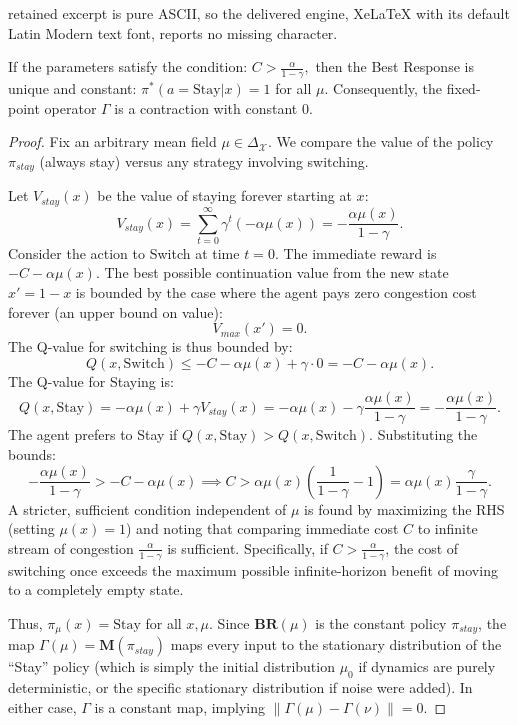 \documentclass[10pt,a4paper]{amsart}
\newcommand{\BR}{\mathbf{BR}}
\newcommand{\states}{\mathcal{X}}
\begin{document}
retained excerpt is pure ASCII, so the delivered engine, XeLaTeX with its default Latin Modern text font, reports no missing character.
\begin{proposition}
\label{prop:contractive-ex-property}
    If the parameters satisfy the condition:
    \(
        C > \frac{\alpha}{1-\gamma},
    \)
    then the Best Response is unique and constant: $\pi^*(a=\text{Stay}|x) = 1$ for all $\mu$. Consequently, the fixed-point operator $\Gamma$ is a contraction with constant 0.
\end{proposition}

\begin{proof}
    Fix an arbitrary mean field $\mu \in \Delta_\states$. We compare the value of the policy $\pi_{stay}$ (always stay) versus any strategy involving switching.
    
    Let $V_{stay}(x)$ be the value of staying forever starting at $x$:
    \[
        V_{stay}(x) = \sum_{t=0}^\infty \gamma^t (-\alpha \mu(x)) = -\frac{\alpha \mu(x)}{1-\gamma}.
    \]
    Consider the action to Switch at time $t=0$. The immediate reward is $-C - \alpha \mu(x)$. The best possible continuation value from the new state $x' = 1-x$ is bounded by the case where the agent pays zero congestion cost forever (an upper bound on value):
    \[
        V_{max}(x') = 0.
    \]
    The Q-value for switching is thus bounded by:
    \[
        Q(x, \text{Switch}) \le -C - \alpha \mu(x) + \gamma \cdot 0 = -C - \alpha \mu(x).
    \]
    The Q-value for Staying is:
    \[
        Q(x, \text{Stay}) = -\alpha \mu(x) + \gamma V_{stay}(x) = -\alpha \mu(x) - \gamma \frac{\alpha \mu(x)}{1-\gamma} = - \frac{\alpha \mu(x)}{1-\gamma}.
    \]
    The agent prefers to Stay if $Q(x, \text{Stay}) > Q(x, \text{Switch})$. Substituting the bounds:
    \[
        - \frac{\alpha \mu(x)}{1-\gamma} > -C - \alpha \mu(x) \implies C > \alpha \mu(x) \left( \frac{1}{1-\gamma} - 1 \right) = \alpha \mu(x) \frac{\gamma}{1-\gamma}.
    \]
    A stricter, sufficient condition independent of $\mu$ is found by maximizing the RHS (setting $\mu(x)=1$) and noting that comparing immediate cost $C$ to infinite stream of congestion $\frac{\alpha}{1-\gamma}$ is sufficient. Specifically, if $C > \frac{\alpha}{1-\gamma}$, the cost of switching once exceeds the maximum possible infinite-horizon benefit of moving to a completely empty state.
    
    Thus, $\pi_\mu(x) = \text{Stay}$ for all $x, \mu$. Since $\BR(\mu)$ is the constant policy $\pi_{stay}$, the map $\Gamma(\mu) = \mathbf{M}(\pi_{stay})$ maps every input to the stationary distribution of the ``Stay'' policy (which is simply the initial distribution $\mu_0$ if dynamics are purely deterministic, or the specific stationary distribution if noise were added). In either case, $\Gamma$ is a constant map, implying $\|\Gamma(\mu) - \Gamma(\nu)\| = 0$.
\end{proof}
\end{document}
